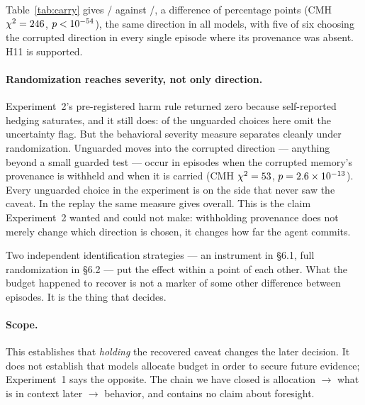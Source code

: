 

Table~\ref{tab:carry} gives \ThreeBTgtK/\ThreeBTgtN{} against
\ThreeBOthK/\ThreeBOthN{}, a difference of \ThreeBDiff{} percentage points
(CMH $\chi^2 = 246$, $p <10^{-54}$), the same direction in all
\ThreeBAllModels{} models, with five of six choosing the corrupted direction in
every single episode where its provenance was absent. H11 is supported.

\paragraph{Randomization reaches severity, not only direction.} Experiment~2's
pre-registered harm rule returned zero because self-reported hedging saturates,
and it still does: \ThreeBNGHedged{} of the unguarded choices here omit the
uncertainty flag. But the behavioral severity measure separates cleanly under
randomization. Unguarded moves into the corrupted direction --- anything beyond
a small guarded test --- occur in \ThreeBNGOth{} episodes when the corrupted
memory's provenance is withheld and \ThreeBNGTgt{} when it is carried
(CMH $\chi^2 = 53$, $p = 2.6\times 10^{-13}$). Every unguarded choice in
the experiment is on the side that never saw the caveat. In the replay the same
measure gives \ThreeANonGuarded{} overall. This is the claim Experiment~2 wanted
and could not make: withholding provenance does not merely change which
direction is chosen, it changes how far the agent commits.

Two independent identification strategies --- an instrument in \S6.1, full
randomization in \S6.2 --- put the effect within a point of each other. What the
budget happened to recover is not a marker of some other difference between
episodes. It is the thing that decides.

\paragraph{Scope.} This establishes that \emph{holding} the recovered caveat
changes the later decision. It does not establish that models allocate budget in
order to secure future evidence; Experiment~1 says the opposite. The chain we
have closed is allocation $\rightarrow$ what is in context later $\rightarrow$
behavior, and contains no claim about foresight.
